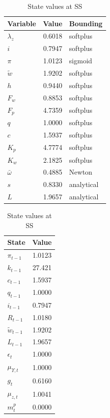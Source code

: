 \documentclass[11pt]{article}
\begin{document}
\begin{table}[h!]
\centering
\begin{minipage}[t]{0.45\linewidth}
\centering
\caption{Policy values at SS}
\begin{tabular}{lrl}
\toprule
Variable & Value & Bounding \\
\midrule
$\lambda_z$  & 0.6018 & softplus \\
$i$          & 0.7947 & softplus \\
$\pi$        & 1.0123 & sigmoid \\
$\tilde{w}$  & 1.9202 & softplus \\
$h$          & 0.9440 & softplus \\
$F_w$        & 0.8853 & softplus \\
$F_p$        & 4.7359 & softplus \\
$q$          & 1.0000 & softplus \\
$c$          & 1.5937 & softplus \\
$K_p$        & 4.7774 & softplus \\
$K_w$        & 2.1825 & softplus \\
\midrule
$\bar\omega$ & 0.4885 & Newton \\
$s$          & 0.8330 & analytical \\
$L$          & 1.9657 & analytical \\
\bottomrule
\end{tabular}
\end{minipage}\hfill
\begin{minipage}[t]{0.45\linewidth}
\centering
\caption{State values at SS}
\begin{tabular}{lr}
\toprule
State & Value \\
\midrule
$\pi_{t-1}$        & 1.0123 \\
$k_{t-1}$          & 27.421 \\
$c_{t-1}$          & 1.5937 \\
$q_{t-1}$          & 1.0000 \\
$i_{t-1}$          & 0.7947 \\
$R_{t-1}$          & 1.0180 \\
$\tilde{w}_{t-1}$  & 1.9202 \\
$L_{t-1}$          & 1.9657 \\
\midrule
$\epsilon_t$       & 1.0000 \\
$\mu_{\Upsilon,t}$ & 1.0000 \\
$g_t$              & 0.6160 \\
$\mu_{z,t}$        & 1.0041 \\
$m_t^p$            & 0.0000 \\
\bottomrule
\end{tabular}
\bigskip


\end{minipage}
\end{table}
\end{document}
